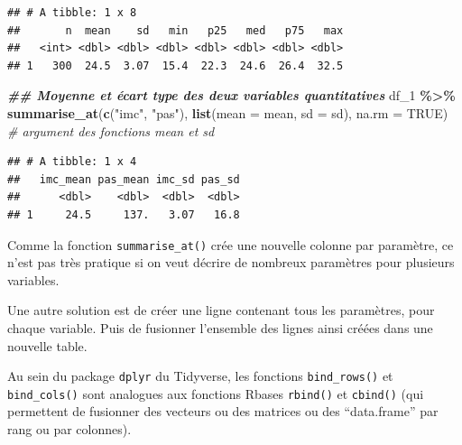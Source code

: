 \documentclass[
]{book}
\newenvironment{Shaded}{\begin{snugshade}}{\end{snugshade}}
\newcommand{\AttributeTok}[1]{\textcolor[rgb]{0.13,0.29,0.53}{#1}}
\newcommand{\CommentTok}[1]{\textcolor[rgb]{0.56,0.35,0.01}{\textit{#1}}}
\newcommand{\ConstantTok}[1]{\textcolor[rgb]{0.56,0.35,0.01}{#1}}
\newcommand{\DocumentationTok}[1]{\textcolor[rgb]{0.56,0.35,0.01}{\textbf{\textit{#1}}}}
\newcommand{\FunctionTok}[1]{\textcolor[rgb]{0.13,0.29,0.53}{\textbf{#1}}}
\newcommand{\NormalTok}[1]{#1}
\newcommand{\SpecialCharTok}[1]{\textcolor[rgb]{0.81,0.36,0.00}{\textbf{#1}}}
\newcommand{\StringTok}[1]{\textcolor[rgb]{0.31,0.60,0.02}{#1}}
\begin{document}
\begin{verbatim}
## # A tibble: 1 x 8
##       n  mean    sd   min   p25   med   p75   max
##   <int> <dbl> <dbl> <dbl> <dbl> <dbl> <dbl> <dbl>
## 1   300  24.5  3.07  15.4  22.3  24.6  26.4  32.5
\end{verbatim}

\begin{Shaded}
\begin{Highlighting}[]
\DocumentationTok{\#\# Moyenne et écart type des deux variables quantitatives }
\NormalTok{df\_1 }\SpecialCharTok{\%\textgreater{}\%} \FunctionTok{summarise\_at}\NormalTok{(}\FunctionTok{c}\NormalTok{(}\StringTok{"imc"}\NormalTok{, }\StringTok{"pas"}\NormalTok{), }
                      \FunctionTok{list}\NormalTok{(}\AttributeTok{mean =}\NormalTok{ mean, }
                           \AttributeTok{sd =}\NormalTok{ sd), }
                      \AttributeTok{na.rm =} \ConstantTok{TRUE}\NormalTok{) }\CommentTok{\# argument des fonctions mean et sd}
\end{Highlighting}
\end{Shaded}

\begin{verbatim}
## # A tibble: 1 x 4
##   imc_mean pas_mean imc_sd pas_sd
##      <dbl>    <dbl>  <dbl>  <dbl>
## 1     24.5     137.   3.07   16.8
\end{verbatim}

Comme la fonction \texttt{summarise\_at()} crée une nouvelle colonne par paramètre, ce n'est pas très pratique si on veut décrire de nombreux paramètres pour plusieurs variables.

Une autre solution est de créer une ligne contenant tous les paramètres, pour chaque variable. Puis de fusionner l'ensemble des lignes ainsi créées dans une nouvelle table.

Au sein du package \texttt{dplyr} du Tidyverse, les fonctions \texttt{bind\_rows()} et \texttt{bind\_cols()} sont analogues aux fonctions Rbases \texttt{rbind()} et \texttt{cbind()} (qui permettent de fusionner des vecteurs ou des matrices ou des ``data.frame'' par rang ou par colonnes).
\end{document}

